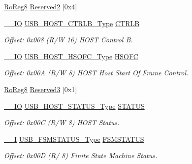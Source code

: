 \begin{DoxyCompactItemize}
\mbox{\hyperlink{group___s_a_m_d21_e15_a__definitions_ga0d957f1433aaf5d70e4dc2b68288442d}{Ro\+Reg8}} \mbox{\hyperlink{struct_usb_host_a78f3c89e13bd565a077e9418f43aaa04}{Reserved2}} \mbox{[}0x4\mbox{]}
\item 
\mbox{\hyperlink{core__cm0plus_8h_aec43007d9998a0a0e01faede4133d6be}{\+\_\+\+\_\+\+IO}} \mbox{\hyperlink{union_u_s_b___h_o_s_t___c_t_r_l_b___type}{U\+S\+B\+\_\+\+H\+O\+S\+T\+\_\+\+C\+T\+R\+L\+B\+\_\+\+Type}} \mbox{\hyperlink{struct_usb_host_abf548d767462ac8a8c067e067d688798}{C\+T\+R\+LB}}
\begin{DoxyCompactList}\small\item\em Offset\+: 0x008 (R/W 16) H\+O\+ST Control B. \end{DoxyCompactList}\item 
\mbox{\hyperlink{core__cm0plus_8h_aec43007d9998a0a0e01faede4133d6be}{\+\_\+\+\_\+\+IO}} \mbox{\hyperlink{union_u_s_b___h_o_s_t___h_s_o_f_c___type}{U\+S\+B\+\_\+\+H\+O\+S\+T\+\_\+\+H\+S\+O\+F\+C\+\_\+\+Type}} \mbox{\hyperlink{struct_usb_host_a275b218a05da429a550ae72e392a570d}{H\+S\+O\+FC}}
\begin{DoxyCompactList}\small\item\em Offset\+: 0x00A (R/W 8) H\+O\+ST Host Start Of Frame Control. \end{DoxyCompactList}\item 
\mbox{\hyperlink{group___s_a_m_d21_e15_a__definitions_ga0d957f1433aaf5d70e4dc2b68288442d}{Ro\+Reg8}} \mbox{\hyperlink{struct_usb_host_ae12c3e940f27988a085afebe2f779a21}{Reserved3}} \mbox{[}0x1\mbox{]}
\item 
\mbox{\hyperlink{core__cm0plus_8h_aec43007d9998a0a0e01faede4133d6be}{\+\_\+\+\_\+\+IO}} \mbox{\hyperlink{union_u_s_b___h_o_s_t___s_t_a_t_u_s___type}{U\+S\+B\+\_\+\+H\+O\+S\+T\+\_\+\+S\+T\+A\+T\+U\+S\+\_\+\+Type}} \mbox{\hyperlink{struct_usb_host_a27b024fc9d1a50ffd83cb5a02acaeae4}{S\+T\+A\+T\+US}}
\begin{DoxyCompactList}\small\item\em Offset\+: 0x00C (R/W 8) H\+O\+ST Status. \end{DoxyCompactList}\item 
\mbox{\hyperlink{core__cm0plus_8h_af63697ed9952cc71e1225efe205f6cd3}{\+\_\+\+\_\+I}} \mbox{\hyperlink{union_u_s_b___f_s_m_s_t_a_t_u_s___type}{U\+S\+B\+\_\+\+F\+S\+M\+S\+T\+A\+T\+U\+S\+\_\+\+Type}} \mbox{\hyperlink{struct_usb_host_a96bd1d241ecd0cfafc7b234d2d76f769}{F\+S\+M\+S\+T\+A\+T\+US}}
\begin{DoxyCompactList}\small\item\em Offset\+: 0x00D (R/ 8) Finite State Machine Status. \end{DoxyCompactList}\item 

\end{DoxyCompactItemize}
